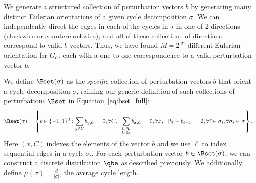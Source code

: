 \documentclass[10pt]{article}
\begin{document}
\begin{ReviewVerbatim}
	We generate a structured collection of perturbation vectors $b$ by generating many distinct Eulerian orientations of a given cycle decomposition $\sigma$. We can independently direct the edges in each of the	cycles in $\sigma$ in one of 2 directions (clockwise or counterclockwise), and all of these collections of directions correspond to valid $b$ vectors. Thus, we have found $M=2^{|\sigma|}$ different Eulerian orientation for $G_\mathcal{C}$, each with a one-to-one correspondence to a valid perturbation vector $b$.

	We define $\Bset(\sigma)$ as the {\it specific} collection of perturbation vectors $b$ that orient a cycle decomposition $\sigma$, refining our generic definition of such collections of perturbations $\Bset$ in Equation~\eqref{eq:bset_full}:
	\begin{align}
	\label{eq:bset}
	\Bset(\sigma) =
	\left \{
	b \in \lbrace -1, 1 \rbrace^d
	:
	\sum_{y \in C} b_{y,C} = 0, \forall C,
	\ \
	\sum_{\substack{C \in \mathcal{C}\\ C \ni x}} b_{x,C} = 0, \forall x,
	\ \
	|b_\ell - b_{\ell+1} | =2, \forall \ell \in \sigma_i,
	\forall \sigma_i \in \sigma
	\right \}.
	\end{align}
	Here $(x,C)$ indexes the elements of the vector $b$ and we use $\ell$ to index sequential edges in a cycle $\sigma_i$. For each perturbation vector $b \in \Bset(\sigma)$, we can construct a discrete distribution $\qbe$ as described previously. We additionally define $\mu(\sigma) = \frac{d}{|\sigma|}$, the average cycle length.
\end{ReviewVerbatim}
\end{document}
